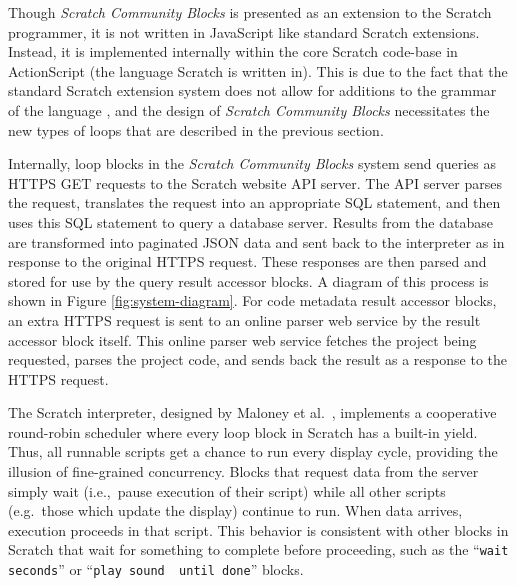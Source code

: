 \documentclass{sigchi}
\begin{document}
Though \emph{Scratch Community Blocks} is presented as an extension to the Scratch programmer, it is not written in JavaScript like standard Scratch extensions. Instead, it is implemented internally within the core Scratch code-base in ActionScript (the language Scratch is written in). This is due to the fact that the standard Scratch extension system does not allow for additions to the grammar of the language \cite{dasgupta_extending_2015}, and the design of \emph{Scratch Community Blocks} necessitates the new types of loops that are described in the previous section.

Internally, loop blocks in the \emph{Scratch Community Blocks} system send queries as HTTPS GET requests to the Scratch website API server. The API server parses the request, translates the request into an appropriate SQL statement, and then uses this SQL statement to query a database server. Results from the database are transformed into paginated JSON data and sent back to the interpreter as in response to the original HTTPS request. These responses are then parsed and stored for use by the query result accessor blocks. A diagram of this process is shown in Figure \ref{fig:system-diagram}. For code metadata result accessor blocks, an extra HTTPS request is sent to an online parser web service by the result accessor block itself. This online parser web service fetches the project being requested, parses the project code, and sends back the result as a response to the HTTPS request.

The Scratch interpreter, designed by Maloney et al.~\cite{maloney_scratch_2010}, implements a cooperative round-robin scheduler where every loop block in Scratch has a built-in yield. Thus, all runnable scripts get a chance to run every display cycle, providing the illusion of fine-grained concurrency. Blocks that request data from the server simply wait (i.e.,~pause execution of their script) while all other scripts (e.g.\ those which update the display) continue to run. When data arrives, execution proceeds in that script. This behavior is consistent with other blocks in Scratch that wait for something to complete before proceeding, such as the ``\texttt{wait \underline{\hspace{0.5cm}} seconds}'' or  ``\texttt{play sound \underline{\hspace{0.5cm}} until done}'' blocks.
\end{document}
